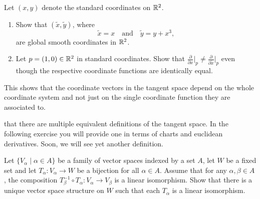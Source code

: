 \begin{exercise}
  Let $(x,y)$ denote the standard coordinates on $\mathbb{R}^2$.
  \begin{enumerate}
    \item Show that $(\widetilde{x}, \widetilde{y})$, where
          \begin{equation}
            \widetilde{x} = x
            \quad\mbox{and}\quad
            \widetilde{y} = y + x^3,
          \end{equation}
          are global smooth coordinates in $\mathbb{R}^2$.
    \item Let $p=(1,0)\in\mathbb{R}^2$ in standard coordinates.
          Show that $\frac{\partial}{\partial x}\Big|_p \neq \frac{\partial}{\partial \widetilde x}\Big|_p$ even though the respective coordinate functions are identically equal.
  \end{enumerate}
  This shows that the coordinate vectors in the tangent space depend on the whole coordinate system and not just on the single coordinate function they are associated to.
\end{exercise}

 that there are multiple equivalent definitions of the tangent space. In the following exercise you will provide one in terms of charts and euclidean derivatives.
Soon, we will see yet another definition.

\begin{exercise}\label{exe:vsstruct}
  Let $\{V_\alpha \mid \alpha\in A\}$ be a family of vector spaces indexed by a set $A$, let $W$ be a fixed set and let $T_\alpha: V_\alpha\to W$ be a bijection for all $\alpha\in A$.
  Assume that for any $\alpha, \beta \in A$, the composition $T_\beta^{-1}\circ T_\alpha : V_\alpha \to V_\beta$ is a linear isomorphism.
  Show that there is a unique vector space structure on $W$ such that each $T_\alpha$ is a linear isomorphism.
\end{exercise}

